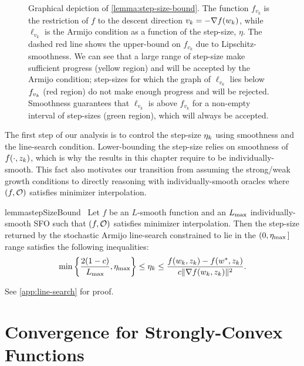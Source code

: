 \begin{figure}[t]
    \centering
    
    \caption{%
        Graphical depiction of \autoref{lemma:step-size-bound}.
        The function \( f_{v_k} \) is the restriction of \( f \) to the descent direction \( v_k = -\grad(\wk) \), while \( \ell_{v_k} \) is the Armijo condition as a function of the step-size, \( \eta \).
        The dashed red line shows the upper-bound on \( f_{v_k} \) due to Lipschitz-smoothness.
        We can see that a large range of step-size make sufficient progress (yellow region) and will be accepted by the Armijo condition; step-sizes for which the graph of \( \ell_{v_k} \) lies below \( f_{\vk} \) (red region) do not make enough progress and will be rejected. 
        Smoothness guarantees that \( \ell_{v_k} \) is above \( f_{v_k} \) for a non-empty interval of step-sizes (green region), which will always be accepted.%
    }%
    \label{fig:step-size-bound}
\end{figure}

The first step of our analysis is to control the step-size \( \etak \) using smoothness and the line-search condition.
Lower-bounding the step-size relies on smoothness of \( f(\cdot, \zk) \), which is why the results in this chapter require \oracle{} to be individually-smooth. 
This fact also motivates our transition from assuming the strong/weak growth conditions to directly reasoning with individually-smooth oracles where \( \rbr{f, \oracle{}} \) satisfies minimizer interpolation.
\begin{restatable}{lemma}{stepSizeBound}~\label{lemma:step-size-bound}
    Let \( f \) be an \( L \)-smooth function and \oracle{} an \( \Lmax \) individually-smooth \ac{SFO} such that \( \rbr{f, \oracle{}} \) satisfies minimizer interpolation. 
    Then the step-size returned by the stochastic Armijo line-search constrained to lie in the \( (0, \etamax \, ] \) range satisfies the following inequalities:
    \[ \min\cbr{\frac{2 (1-c)}{\Lmax}, \etamax} \leq \etak \leq \frac{f(\wk, \zk) - f(\wopt, \zk)}{c \norm{\grad(\wk, \zk)}^2}. \]
\end{restatable}
\noindent See \autoref{app:line-search} for proof.

\section{Convergence for Strongly-Convex Functions}~\label{sec:ls-sc}

